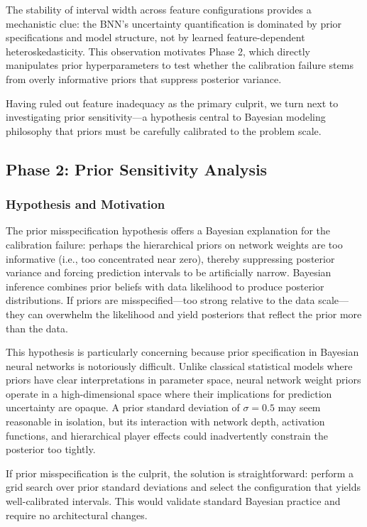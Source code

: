 The stability of interval width across feature configurations provides a mechanistic clue: the BNN's uncertainty quantification is dominated by prior specifications and model structure, not by learned feature-dependent heteroskedasticity. This observation motivates Phase 2, which directly manipulates prior hyperparameters to test whether the calibration failure stems from overly informative priors that suppress posterior variance.

Having ruled out feature inadequacy as the primary culprit, we turn next to investigating prior sensitivity—a hypothesis central to Bayesian modeling philosophy that priors must be carefully calibrated to the problem scale.

\subsection{Phase 2: Prior Sensitivity Analysis}
\label{subsec:phase2_priors}

\subsubsection{Hypothesis and Motivation}

The prior misspecification hypothesis offers a Bayesian explanation for the calibration failure: perhaps the hierarchical priors on network weights are too informative (i.e., too concentrated near zero), thereby suppressing posterior variance and forcing prediction intervals to be artificially narrow. Bayesian inference combines prior beliefs with data likelihood to produce posterior distributions. If priors are misspecified—too strong relative to the data scale—they can overwhelm the likelihood and yield posteriors that reflect the prior more than the data.

This hypothesis is particularly concerning because prior specification in Bayesian neural networks is notoriously difficult. Unlike classical statistical models where priors have clear interpretations in parameter space, neural network weight priors operate in a high-dimensional space where their implications for prediction uncertainty are opaque. A prior standard deviation of $\sigma = 0.5$ may seem reasonable in isolation, but its interaction with network depth, activation functions, and hierarchical player effects could inadvertently constrain the posterior too tightly.

If prior misspecification is the culprit, the solution is straightforward: perform a grid search over prior standard deviations and select the configuration that yields well-calibrated intervals. This would validate standard Bayesian practice and require no architectural changes.


